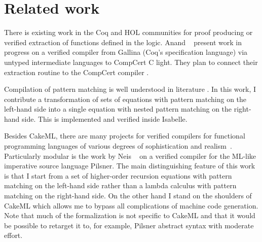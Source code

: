 
\section{Related work}

There is existing work in the Coq \cite{anand2017certicoq,forster2016extraction} and HOL \cite{myreen2014translation} communities for proof producing or verified extraction of functions defined in the logic.
Anand \etal\ \cite{anand2017certicoq} present work in progress on a verified compiler from Gallina (Coq's specification language) via untyped intermediate languages to CompCert C light.
They plan to connect their extraction routine to the CompCert compiler \cite{leroy2009compiler}.

Compilation of pattern matching is well understood in literature \cite{augustsson1985pattern,peytonjones1987implementation,slind1999terminating}.
In this work, I contribute a transformation of sets of equations with pattern matching on the left-hand side into a single equation with nested pattern matching on the right-hand side. This is implemented and verified inside Isabelle.

Besides CakeML, there are many projects for verified compilers for functional programming languages of various degrees of sophistication and realism~\cite{BentonH09,Chlipala10,Flatau}.
Particularly modular is the work by Neis \etal\ \cite{neis2015pilsner} on a verified compiler for the ML-like imperative source language Pilsner.
The main distinguishing feature of this work is that I start from a set of higher-order recursion equations with pattern matching on the left-hand side rather than a lambda calculus with pattern matching on the right-hand side.
On the other hand I stand on the shoulders of CakeML which allows me to bypass all complications of machine code generation.
Note that much of the formalization is not specific to CakeML and that it would be possible to retarget it to, for example, Pilsner abstract syntax with moderate effort.